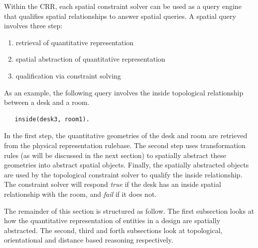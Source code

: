 \documentclass[12pt]{ucthesis}
\begin{document}
Within the CRR, each spatial constraint solver can be used as a query engine that qualifies spatial relationships to answer spatial queries.  A spatial query involves three step:
\begin{enumerate}
\item retrieval of quantitative representation 
\item spatial abstraction of quantitative representation
\item qualification via constraint solving
\end{enumerate}  
As an example, the following query involves the inside topological relationship between a desk and a room. 
\begin{verbatim}
   inside(desk3, room1).
\end{verbatim} In the first step, the quantitative geometries of the desk and room are retrieved from the physical representation rulebase. The second step uses transformation rules (as will be discussed in the next section) to spatially abstract these geometries into abstract spatial objects. Finally, the spatially abstracted objects are used by the topological constraint solver to qualify the inside relationship. The constraint solver will respond \emph{true} if the desk has an inside spatial relationship with the room, and \emph{fail} if it does not.   


The remainder of this section is structured as follow. The first subsection looks at how the quantitative representation of entities in a design are spatially abstracted. The second, third and forth subsections look at topological, orientational and distance based reasoning respectively.
\end{document}
